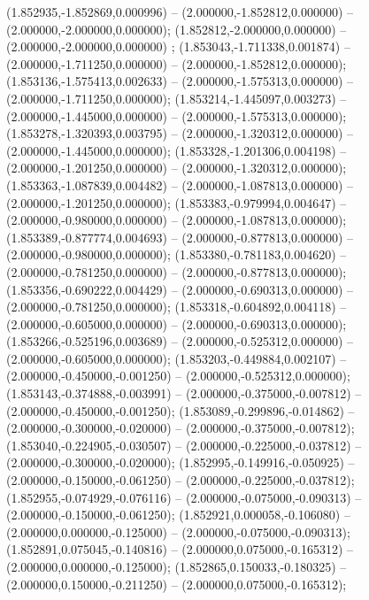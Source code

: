  (1.852935,-1.852869,0.000996) -- (2.000000,-1.852812,0.000000) -- (2.000000,-2.000000,0.000000);
 (1.852812,-2.000000,0.000000) -- (2.000000,-2.000000,0.000000) ;
 (1.853043,-1.711338,0.001874) -- (2.000000,-1.711250,0.000000) -- (2.000000,-1.852812,0.000000);
 (1.853136,-1.575413,0.002633) -- (2.000000,-1.575313,0.000000) -- (2.000000,-1.711250,0.000000);
 (1.853214,-1.445097,0.003273) -- (2.000000,-1.445000,0.000000) -- (2.000000,-1.575313,0.000000);
 (1.853278,-1.320393,0.003795) -- (2.000000,-1.320312,0.000000) -- (2.000000,-1.445000,0.000000);
 (1.853328,-1.201306,0.004198) -- (2.000000,-1.201250,0.000000) -- (2.000000,-1.320312,0.000000);
 (1.853363,-1.087839,0.004482) -- (2.000000,-1.087813,0.000000) -- (2.000000,-1.201250,0.000000);
 (1.853383,-0.979994,0.004647) -- (2.000000,-0.980000,0.000000) -- (2.000000,-1.087813,0.000000);
 (1.853389,-0.877774,0.004693) -- (2.000000,-0.877813,0.000000) -- (2.000000,-0.980000,0.000000);
 (1.853380,-0.781183,0.004620) -- (2.000000,-0.781250,0.000000) -- (2.000000,-0.877813,0.000000);
 (1.853356,-0.690222,0.004429) -- (2.000000,-0.690313,0.000000) -- (2.000000,-0.781250,0.000000);
 (1.853318,-0.604892,0.004118) -- (2.000000,-0.605000,0.000000) -- (2.000000,-0.690313,0.000000);
 (1.853266,-0.525196,0.003689) -- (2.000000,-0.525312,0.000000) -- (2.000000,-0.605000,0.000000);
 (1.853203,-0.449884,0.002107) -- (2.000000,-0.450000,-0.001250) -- (2.000000,-0.525312,0.000000);
 (1.853143,-0.374888,-0.003991) -- (2.000000,-0.375000,-0.007812) -- (2.000000,-0.450000,-0.001250);
 (1.853089,-0.299896,-0.014862) -- (2.000000,-0.300000,-0.020000) -- (2.000000,-0.375000,-0.007812);
 (1.853040,-0.224905,-0.030507) -- (2.000000,-0.225000,-0.037812) -- (2.000000,-0.300000,-0.020000);
 (1.852995,-0.149916,-0.050925) -- (2.000000,-0.150000,-0.061250) -- (2.000000,-0.225000,-0.037812);
 (1.852955,-0.074929,-0.076116) -- (2.000000,-0.075000,-0.090313) -- (2.000000,-0.150000,-0.061250);
 (1.852921,0.000058,-0.106080) -- (2.000000,0.000000,-0.125000) -- (2.000000,-0.075000,-0.090313);
 (1.852891,0.075045,-0.140816) -- (2.000000,0.075000,-0.165312) -- (2.000000,0.000000,-0.125000);
 (1.852865,0.150033,-0.180325) -- (2.000000,0.150000,-0.211250) -- (2.000000,0.075000,-0.165312);
